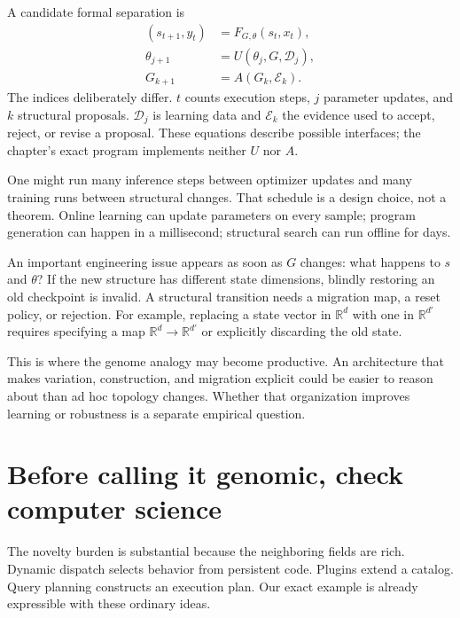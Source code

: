 A candidate formal separation is
\[
 \begin{aligned}
 (s_{t+1},y_t)&=F_{G,\theta}(s_t,x_t),\\
 \theta_{j+1}&=U(\theta_j,G,\mathcal D_j),\\
 G_{k+1}&=A(G_k,\mathcal E_k).
 \end{aligned}
\]
The indices deliberately differ. $t$ counts execution steps, $j$ parameter updates, and $k$ structural proposals. $\mathcal D_j$ is learning data and $\mathcal E_k$ the evidence used to accept, reject, or revise a proposal. These equations describe possible interfaces; the chapter's exact program implements neither $U$ nor $A$.

One might run many inference steps between optimizer updates and many training runs between structural changes. That schedule is a design choice, not a theorem. Online learning can update parameters on every sample; program generation can happen in a millisecond; structural search can run offline for days.

An important engineering issue appears as soon as $G$ changes: what happens to $s$ and $\theta$? If the new structure has different state dimensions, blindly restoring an old checkpoint is invalid. A structural transition needs a migration map, a reset policy, or rejection. For example, replacing a state vector in $\mathbb R^d$ with one in $\mathbb R^{d'}$ requires specifying a map $\mathbb R^d\to\mathbb R^{d'}$ or explicitly discarding the old state.

This is where the genome analogy may become productive. An architecture that makes variation, construction, and migration explicit could be easier to reason about than ad hoc topology changes. Whether that organization improves learning or robustness is a separate empirical question.

\section{Before calling it genomic, check computer science}\label{sec:alternatives}
The novelty burden is substantial because the neighboring fields are rich. Dynamic dispatch selects behavior from persistent code. Plugins extend a catalog. Query planning constructs an execution plan. Our exact example is already expressible with these ordinary ideas.

